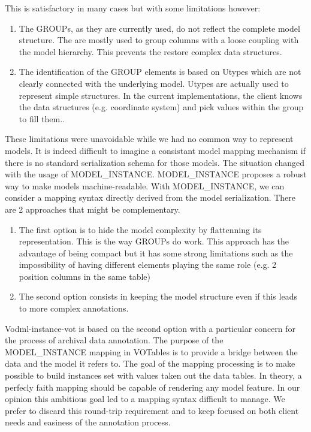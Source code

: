 \documentclass[11pt,a4paper]{ivoa}
\begin{document}
This is satisfactory in many cases but with some limitations however:\begin{enumerate}
   \item The GROUPs, as they are currently used, do not reflect the complete model structure. The are mostly used to group columns with a loose coupling with the model hierarchy. This prevents the restore complex data structures.
   \item The identification of the GROUP elements is based on Utypes which are not clearly connected with the underlying model. Utypes are actually used to represent simple structures. In the current implementations, the client knows the data structures (e.g. coordinate system) and pick values within the group to fill them..
\end{enumerate}
These limitations were unavoidable while we had no common way to represent  models. It is indeed difficult to imagine a consistant model mapping mechanism if there is no standard serialization schema for those models. The situation changed with the usage of MODEL_INSTANCE. MODEL_INSTANCE proposes a robust way to make models machine-readable. With MODEL_INSTANCE, we can consider a mapping syntax directly derived from the model serialization. There are 2 approaches that might be complementary. 
\begin{enumerate}
   \item The first option is to hide the model complexity by flattenning its representation. This is the way GROUPs do work. This approach has the advantage of being compact but it has some strong limitations such as the impossibility of having different elements playing the same role (e.g. 2 position columns in the same table)
   \item The second option consists in keeping the model structure even if this leads to more complex annotations.
\end{enumerate}


Vodml-instance-vot is based on the second option with a particular concern for the process of archival data annotation. The purpose of the MODEL_INSTANCE mapping in VOTables is to provide a bridge between the data and the model it refers to. The goal of the mapping processing is to make possible to build instances set with values taken out the data tables. In theory, a perfecly faith mapping should be capable of rendering any model feature. In our opinion this ambitious goal led to a mapping syntax difficult to manage.
We prefer to discard this round-trip requirement and to keep focused on both client needs and easiness of the annotation process.
\end{document}
